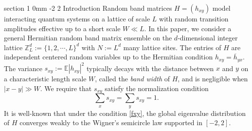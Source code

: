 \documentclass{article}
\makeatletter
\newcommand{\1}{\mathds{1}}
\numberwithin{equation}{section}
\newcommand{\be}{\begin{equation}}
\newcommand{\ee}{\end{equation}}
\renewcommand{\geq}{\geqslant}
\renewcommand{\ge}{\geq}
\newcommand{\Z}{\mathbb{Z}}
\theoremstyle{plain} %
\theoremstyle{remark}
\renewcommand{\section}{\@startsection
	{section}%
	{1}%
	{0mm}%
	{-2\baselineskip}%
	{2\baselineskip}%
	{\normalfont\large\scshape\centering}} %
\renewcommand{\subsection}{\@startsection
	{subsection}%
	{2}%
	{0mm}%
	{-\baselineskip}%
	{0.5\baselineskip}%
	{\normalfont\bf\itshape}} %
\makeatother
\begin{document}
\tableofcontents


\vspace{20pt}



\newpage
\section{Introduction}
Random band matrices $H=(h_{xy})$ model interacting quantum systems on a lattice of scale $L$ with random transition amplitudes effective up to a short scale $W\ll L$. In this paper, we consider a general Hermitian random band matrix ensemble on the $d$-dimensional integer lattice $\Z_L^d:=\{1,2, \cdots, L\}^d$ with $N:= L^d$ many lattice sites. The entries of $H$ are independent centered random variables  up to the Hermitian condition $h_{xy}=\overline h_{yx}$. The variance $s_{xy}:=\mathbb E|h_{xy}|^2$ typically decays with the distance between $x$ and $y$ on a characteristic length scale $W$, called the {\it band width} of $H$, and is negligible when $|x-y|\gg W$. We require that $s_{xy}$ satisfy the normalization condition  %
\be\label{fxy}
\sum_{x}s_{xy}=\sum_{y}s_{xy}=1.
\ee
It is well-known that under the condition \eqref{fxy}, the global eigenvalue distribution of $H$ converges weakly to the Wigner's semicircle law supported in $[-2,2]$. 
\end{document}
